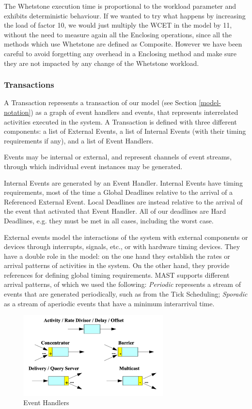 \documentclass{article}
\begin{document}
The Whetstone execution time is proportional to the workload parameter and exhibits deterministic behaviour. If we wanted to try what happens by increasing the load of factor 10, we would just multiply the WCET in the model by 11, without the need to measure again all the Enclosing operations, since all the methods which use Whetstone are defined as Composite. However we have been careful to avoid forgetting any overhead in a Enclosing method and make sure they are not impacted by any change of the Whetstone workload.

\subsubsection{Transactions}

A Transaction represents a transaction of our model (see Section \ref{model-notation}) as a graph of event handlers and events, that represents interrelated activities executed in the system. A Transaction is defined with three different components: a list of External Events, a list of Internal Events (with their timing requirements if any), and a list of Event Handlers.

Events may be internal or external, and represent channels of event streams, through which individual event instances may be generated.

Internal Events are generated by an Event Handler. Internal Events have timing requirements, most of the time a Global Deadlines relative to the arrival of a Referenced External Event. Local Deadlines are instead relative to the arrival of the event that activated that Event Handler. All of our deadlines are Hard Deadlines, e.g. they must be met in all cases, including the worst case.

External events model the interactions of the system with external components or devices through interrupts, signals, etc., or with hardware timing devices. They have a double role in the model: on the one hand they establish the rates or arrival patterns of activities in the system. On the other hand, they provide references for defining global timing requirements. MAST supports different arrival patterns, of which we used the following: \textit{Periodic} represents a stream of events that are generated periodically, such as from the Tick Scheduling; \textit{Sporadic} as a stream of aperiodic events that have a minimum interarrival time.

\begin{figure}[!htbp]
\centering
\includegraphics[width=3in]{images/event-handlers}
\caption{Event Handlers}
\label{event-handlers}
\end{figure}
\end{document}
